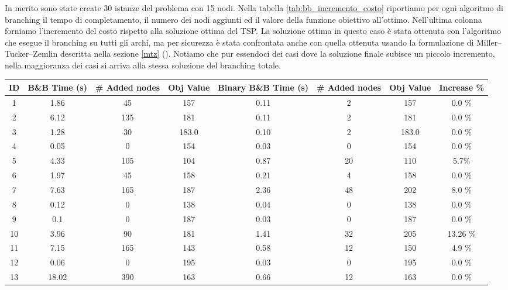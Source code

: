 In merito sono state create 30 istanze del problema con 15 nodi. Nella tabella \ref{tab:bb_incremento_costo} riportiamo per ogni algoritmo di branching il tempo di completamento, il numero dei nodi aggiunti ed il valore della funzione obiettivo all'ottimo. Nell'ultima colonna forniamo l'incremento del costo rispetto alla soluzione ottima del TSP. La soluzione ottima in questo caso è stata ottenuta con l'algoritmo che esegue il branching su tutti gli archi, ma per sicurezza è stata confrontata anche con quella ottenuta usando la formulazione di Miller–Tucker–Zemlin descritta nella sezione \ref{mtz} (). Notiamo che pur essendoci dei casi dove la soluzione finale subisce un piccolo incremento, nella maggioranza dei casi si arriva alla stessa soluzione del branching totale.

\begin{table}[htbp]
    \centering
    \footnotesize
    \setlength{\tabcolsep}{2pt} 
    \renewcommand{\arraystretch}{1.2} 
    \begin{tabular}{|c|c|c|c|c|c|c|c|}
        \hline
        \textbf{ID} & \textbf{B\&B Time (s)} & \textbf{\# Added nodes} & \textbf{Obj Value} & \textbf{Binary B\&B Time (s)} & \textbf{\# Added nodes} & \textbf{Obj Value} & \textbf{Increase \%} \\
        \hline
        1 & 1.86 & 45 & 157 & 0.11 & 2 & 157 & 0.0 \% \\
        2 & 6.12 & 135 & 181 & 0.11 & 2 & 181 & 0.0 \% \\
        3 & 1.28 & 30 & 183.0 & 0.10 & 2 & 183.0 & 0.0 \% \\
        4 & 0.05 & 0 & 154 & 0.03 & 0 & 154 & 0.0 \% \\
        5 & 4.33 & 105 & 104 & 0.87 & 20 & 110 & 5.7\% \\
        6 & 1.97 & 45 & 158 & 0.21 & 4 & 158 & 0.0 \% \\
        7 & 7.63 & 165 & 187 & 2.36 & 48 & 202 & 8.0 \% \\
        8 & 0.12 & 0 & 138 & 0.04 & 0 & 138 & 0.0 \% \\
        9 & 0.1 & 0 & 187 & 0.03 & 0 & 187 & 0.0 \% \\
        10 & 3.96 & 90 & 181 & 1.41 & 32 & 205 & 13.26 \% \\
        11 & 7.15 & 165 & 143 & 0.58 & 12 & 150 & 4.9 \% \\
        12 & 0.06 & 0 & 195 & 0.03 & 0 & 195 & 0.0 \% \\
        13 & 18.02 & 390 & 163 & 0.66 & 12 & 163 & 0.0 \% \\

\end{tabular}
\end{table}
